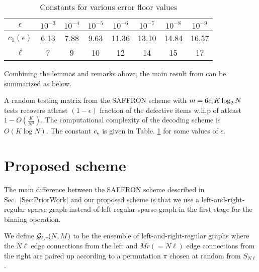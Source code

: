 \begin{table}[t]
\centering
\begin{tabular}{| c | c | c | c | c | c | c | c | }
\hline
$\epsilon$ & $10^{-3}$ & $10^{-4}$ & $10^{-5}$ & $10^{-6}$ &$ 10^{-7}$ & $10^{-8}$ & $10^{-9}$ \\ \hline
$c_1(\epsilon)$ & 6.13 & 7.88 & 9.63 & 11.36 & 13.10 & 14.84 & 16.57 \\ \hline
 $\ell$ & 7 & 9 & 10 & 12 & 14 & 15 & 17 \\ \hline
\end{tabular}
\vspace{1ex}
\caption{Constants for various error floor values}
\label{Table:constantsDE}
\end{table}

Combining the lemmas and remarks above, the main result from \cite{lee2015saffron} can be summarized as below.
\begin{theorem}
A random testing matrix from the SAFFRON scheme with $m=6c_{\epsilon} K \log_{2}N$ tests recovers atleast $(1-\epsilon)$ fraction of the defective items w.h.p of atleast $1-O(\frac{K}{N^2})$. The computational complexity of the decoding scheme is $O(K\log N)$. The constant $c_{\epsilon}$ is given in Table. \ref{Table:constantsDE} for some values of $\epsilon$.
\end{theorem}

\section{Proposed scheme}
The main difference between the SAFFRON scheme described in Sec.~\ref{Sec:PriorWork} and our proposed scheme is that we use a left-and-right-regular sparse-graph instead of left-regular sparse-graph in the first stage for the binning operation.

\begin{definition}
We define $\mathcal{G}_{\ell,r}(N,M)$ to be the ensemble of left-and-right-regular graphs where the $N\ell$ edge connections from the left and $Mr(=N\ell)$ edge connections from the right are paired up according to a permutation $\pi$ chosen at random from $S_{N\ell}$. 
\end{definition}

